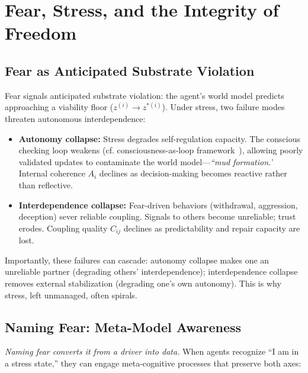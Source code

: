 \documentclass[11pt,a4paper]{article}
\begin{document}
\section{Fear, Stress, and the Integrity of Freedom}

\subsection{Fear as Anticipated Substrate Violation}

Fear signals anticipated substrate violation: the agent's world model predicts approaching a viability floor ($z^{(i)} \to z^{*(i)}$). Under stress, two failure modes threaten autonomous interdependence:

\begin{itemize}
    \item \textbf{Autonomy collapse:} Stress degrades self-regulation capacity. The conscious checking loop weakens (cf. consciousness-as-loop framework~\cite{appendixXI}), allowing poorly validated updates to contaminate the world model---\emph{``mud formation.'} Internal coherence $A_i$ declines as decision-making becomes reactive rather than reflective.
    
    \item \textbf{Interdependence collapse:} Fear-driven behaviors (withdrawal, aggression, deception) sever reliable coupling. Signals to others become unreliable; trust erodes. Coupling quality $C_{ij}$ declines as predictability and repair capacity are lost.
\end{itemize}

Importantly, these failures can cascade: autonomy collapse makes one an unreliable partner (degrading others' interdependence); interdependence collapse removes external stabilization (degrading one's own autonomy). This is why stress, left unmanaged, often spirals.

\subsection{Naming Fear: Meta-Model Awareness}

\emph{Naming fear converts it from a driver into data.} When agents recognize ``I am in a stress state,'' they can engage meta-cognitive processes that preserve both axes:
\end{document}
